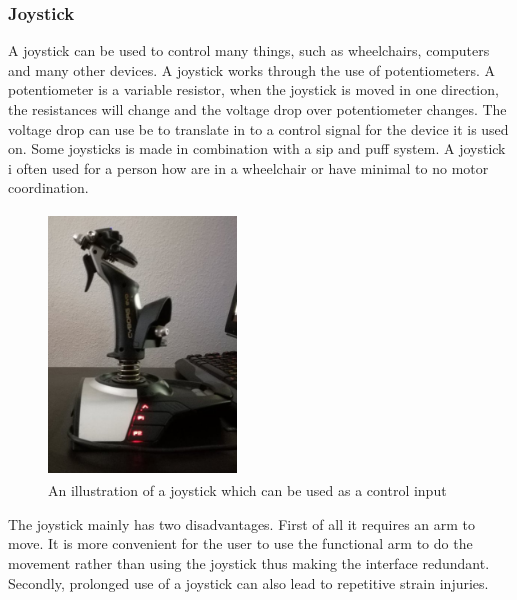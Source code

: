 \subsubsection*{Joystick}
A joystick can be used to control many things, such as wheelchairs, computers and many other devices. A joystick works through the use of potentiometers. A potentiometer is a variable resistor, when the joystick is moved in one direction, the resistances will change and the voltage drop over potentiometer changes. The voltage drop can use be to translate in to a control signal for the device it is used on. Some joysticks is made in combination with a sip and puff system\cite{Jouse}. A joystick i often used for a person how are in a wheelchair or have minimal to no motor coordination.\\ 
\begin{figure}[H]
    \centering
    \includegraphics[width=5cm,height=7cm]{Figures/Contextual_figures/Joystickl.jpg}
    \caption{An illustration of a joystick which can be used as a control input}
    \label{fig:picjoystick}
\end{figure}
The joystick mainly has two disadvantages. First of all it requires an arm to move. It is more convenient for the user to use the functional arm to do the movement rather than using the joystick thus making the interface redundant. Secondly, prolonged use of a joystick can also lead to repetitive strain injuries. 
